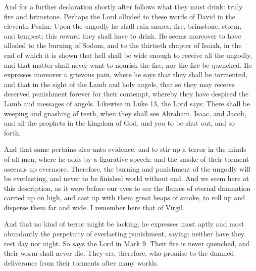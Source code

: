 And for a further declaration shortly after follows what they must drink: truly fire and brimstone. Perhaps the Lord alluded to these words of David in the eleventh Psalm: Upon the ungodly he shall rain snares, fire, brimstone, storm, and tempest; this reward they shall have to drink. He seems moreover to have alluded to the burning of Sodom, and to the thirtieth chapter of Isaiah, in the end of which it is shown that hell shall be wide enough to receive all the ungodly, and that matter shall never want to nourish the fire, nor the fire be quenched. He expresses moreover a grievous pain, where he says that they shall be tormented, and that in the sight of the Lamb and holy angels, that so they may receive deserved punishment forever for their contempt, whereby they have despised the Lamb and messages of angels. Likewise in Luke 13, the Lord says: There shall be weeping and gnashing of teeth, when they shall see Abraham, Isaac, and Jacob, and all the prophets in the kingdom of God, and you to be shut out, and so forth.

And that same pertains also unto evidence, and to stir up a terror in the minds of all men, where he adds by a figurative speech: and the smoke of their torment ascends up evermore. Therefore, the burning and punishment of the ungodly will be everlasting, and never to be finished world without end. And we seem here at this description, as it were before our eyes to see the flames of eternal damnation carried up on high, and cast up with them great heaps of smoke, to roll up and disperse them far and wide. I remember here that of Virgil.

And that no kind of terror might be lacking, he expresses most aptly and most abundantly the perpetuity of everlasting punishment, saying: neither have they rest day nor night. So says the Lord in Mark 9. Their fire is never quenched, and their worm shall never die. They err, therefore, who promise to the damned deliverance from their torments after many worlds.

